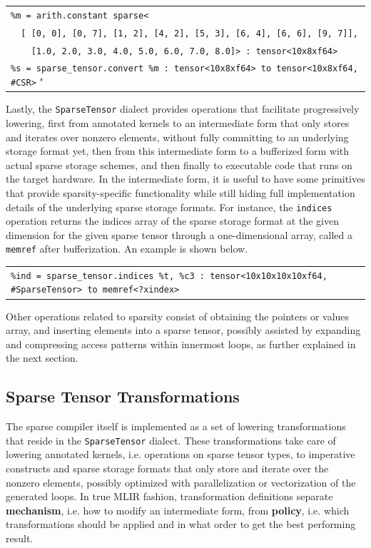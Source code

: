 \documentclass[10pt]{article}
\newcommand{\exam}{\begin{flushleft}\scriptsize\begin{tabular}{l}}
\newcommand{\maxe}{\end{tabular}\end{flushleft}}
\begin{document}
\exam
\verb"%m = arith.constant sparse<" \\
\verb"  [ [0, 0], [0, 7], [1, 2], [4, 2], [5, 3], [6, 4], [6, 6], [9, 7]]," \\
\verb"    [1.0, 2.0, 3.0, 4.0, 5.0, 6.0, 7.0, 8.0]> : tensor<10x8xf64>" \\
\verb"%s = sparse_tensor.convert %m : tensor<10x8xf64> to tensor<10x8xf64, #CSR>" 
\maxe

Lastly, the \texttt{SparseTensor} dialect provides operations that facilitate progressively lowering, first from annotated kernels to an intermediate form that only stores and iterates over nonzero elements, without fully committing to an underlying storage format yet, then from this intermediate form to a bufferized form with actual sparse storage schemes, and then finally to executable code that runs on the target hardware. In the intermediate form, it is useful to have some primitives that provide sparsity-specific functionality while still hiding full implementation details of the underlying sparse storage formats.
For instance, the \texttt{indices} operation returns the indices array of the sparse storage format at the given dimension for the given sparse tensor through a one-dimensional array, called a \texttt{memref} after bufferization. An example is shown below.

\exam
\verb"%ind = sparse_tensor.indices %t, %c3 : tensor<10x10x10x10xf64, #SparseTensor> to memref<?xindex>" \\
\maxe

Other operations related to sparsity consist of obtaining the pointers or values array, and  inserting elements into a sparse tensor, possibly assisted by expanding and compressing access patterns within innermost loops, as further explained in the next section.

\subsection{Sparse Tensor Transformations}
\label{trafo}

The sparse compiler itself is implemented as a set of lowering transformations that reside in the \texttt{SparseTensor} dialect. These transformations take care of lowering annotated kernels, i.e. operations on sparse tensor types, to imperative constructs and sparse storage formats that only store and iterate over the nonzero elements, possibly optimized with parallelization or vectorization of the generated loops. In true MLIR fashion, transformation definitions separate \textbf{mechanism}, i.e. how to modify an intermediate form, from \textbf{policy}, i.e. which transformations should be applied and in what order to get the best performing result.
\end{document}
